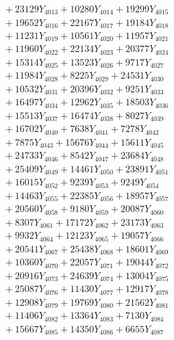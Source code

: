 \documentclass[a4paper,10pt]{article}
\begin{document}
{\begin{align}
&\;  + 23129 Y_{4013} + 10280 Y_{4014} + 19299 Y_{4015} \\[0.3ex]
&\;  + 19652 Y_{4016} + 22167 Y_{4017} + 19184 Y_{4018} \\[0.5ex]\allowbreak
&\;  + 11231 Y_{4019} + 10561 Y_{4020} + 11957 Y_{4021} \\[0.3ex]
&\;  + 11960 Y_{4022} + 22134 Y_{4023} + 20377 Y_{4024} \\[0.3ex]
&\;  + 15314 Y_{4025} + 13523 Y_{4026} + 9717 Y_{4027} \\[0.3ex]
&\;  + 11984 Y_{4028} + 8225 Y_{4029} + 24531 Y_{4030} \\[0.3ex]
&\;  + 10532 Y_{4031} + 20396 Y_{4032} + 9251 Y_{4033} \\[0.3ex]
&\;  + 16497 Y_{4034} + 12962 Y_{4035} + 18503 Y_{4036} \\[0.3ex]
&\;  + 15513 Y_{4037} + 16474 Y_{4038} + 8027 Y_{4039} \\[0.3ex]
&\;  + 16702 Y_{4040} + 7638 Y_{4041} + 7278 Y_{4042} \\[0.3ex]
&\;  + 7875 Y_{4043} + 15676 Y_{4044} + 15611 Y_{4045} \\[0.3ex]
&\;  + 24733 Y_{4046} + 8542 Y_{4047} + 23684 Y_{4048} \\[0.5ex]\allowbreak
&\;  + 25409 Y_{4049} + 14461 Y_{4050} + 23891 Y_{4051} \\[0.3ex]
&\;  + 16015 Y_{4052} + 9239 Y_{4053} + 9249 Y_{4054} \\[0.3ex]
&\;  + 14463 Y_{4055} + 22385 Y_{4056} + 18957 Y_{4057} \\[0.3ex]
&\;  + 20560 Y_{4058} + 9180 Y_{4059} + 20087 Y_{4060} \\[0.3ex]
&\;  + 8307 Y_{4061} + 17172 Y_{4062} + 23173 Y_{4063} \\[0.3ex]
&\;  + 9932 Y_{4064} + 12123 Y_{4065} + 19057 Y_{4066} \\[0.3ex]
&\;  + 20541 Y_{4067} + 25438 Y_{4068} + 18601 Y_{4069} \\[0.3ex]
&\;  + 10360 Y_{4070} + 22057 Y_{4071} + 19044 Y_{4072} \\[0.3ex]
&\;  + 20916 Y_{4073} + 24639 Y_{4074} + 13004 Y_{4075} \\[0.3ex]
&\;  + 25087 Y_{4076} + 11430 Y_{4077} + 12917 Y_{4078} \\[0.5ex]\allowbreak
&\;  + 12908 Y_{4079} + 19769 Y_{4080} + 21562 Y_{4081} \\[0.3ex]
&\;  + 11406 Y_{4082} + 13364 Y_{4083} + 7130 Y_{4084} \\[0.3ex]
&\;  + 15667 Y_{4085} + 14350 Y_{4086} + 6655 Y_{4087} \\[0.3ex]

\end{align}}
\end{document}
